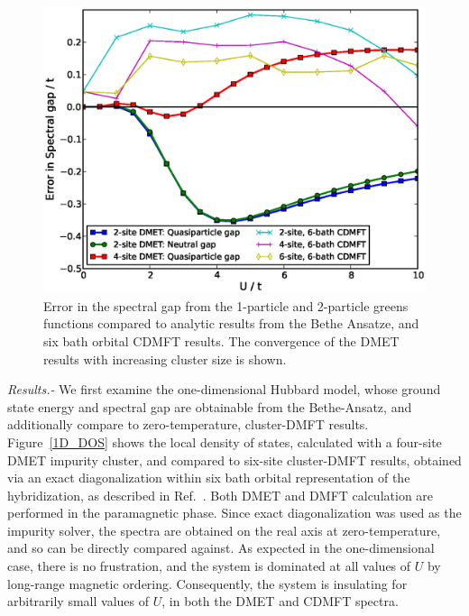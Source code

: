 \documentclass[aps,twocolumn,nobibnotes]{revtex4}
\begin{document}
\begin{figure}
\begin{center}
    \vspace{-2mm}
\includegraphics[scale=0.425]{Plots/1D_Gap/Hubbard_Gap.eps}
\end{center}
    \vspace{-8mm}
\caption{Error in the spectral gap from the 1-particle and 2-particle greens functions compared to analytic results
from the Bethe Ansatze\cite{Ovchinni1970}, and six bath orbital CDMFT results\cite{Go2009}. The convergence of the
DMET results with increasing cluster size is shown.}
\label{1D_GAP}
\end{figure}

\emph{Results.-} We first examine the one-dimensional Hubbard model, whose ground state energy\cite{Lieb68} and spectral gap\cite{Ovchinni1970} are 
obtainable from the Bethe-Ansatz, and additionally compare to
zero-temperature, cluster-DMFT results\cite{Go2009}. Figure~\ref{1D_DOS} shows the local density of states, calculated with a four-site DMET 
impurity cluster, and compared to six-site cluster-DMFT results, obtained via an exact diagonalization within six bath orbital representation 
of the hybridization, as described in Ref.~. Both DMET and DMFT calculation are performed in the paramagnetic phase. 
Since exact diagonalization was used as the impurity solver, 
the spectra are obtained on the real axis at zero-temperature, and so can be directly compared against. As expected in the one-dimensional case, there is no
frustration, and the system is dominated at all values of $U$ by long-range magnetic ordering\cite{Lieb68}. Consequently, 
the system is insulating for arbitrarily small values of $U$, in both the DMET and CDMFT spectra. 
\end{document}
